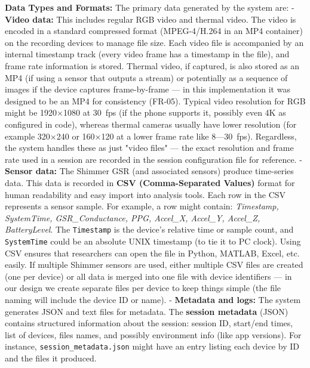 \textbf{Data Types and Formats:} The primary data generated by the system
are: - \textbf{Video data:} This includes regular RGB video and thermal
video. The video is encoded in a standard compressed format
(MPEG-4/H.264 in an MP4 container) on the recording devices to manage
file size. Each video file is accompanied by an internal timestamp track
(every video frame has a timestamp in the file), and frame rate
information is stored. Thermal video, if captured, is also stored as an
MP4 (if using a sensor that outputs a stream) or potentially as a
sequence of images if the device captures frame-by-frame --- in this
implementation it was designed to be an MP4 for consistency (FR-05).
Typical video resolution for RGB might be 1920×1080 at 30 fps (if the
phone supports it, possibly even 4K as configured in
code\cite{CameraRecorder}\cite{CameraRecorder}),
whereas thermal cameras usually have lower resolution (for example
320×240 or 160×120 at a lower frame rate like 8---30 fps). Regardless,
the system handles these as just "video files" --- the exact resolution
and frame rate used in a session are recorded in the session
configuration
file\cite{SessionManagerKt}\cite{DriverStressThermal2020}
for reference. - \textbf{Sensor data:} The Shimmer GSR (and associated
sensors) produce time-series data. This data is recorded in \textbf{CSV
(Comma-Separated Values)} format for human readability and easy import
into analysis tools. Each row in the CSV represents a sensor sample. For
example, a row might contain: \textit{Timestamp, SystemTime, GSR_Conductance,
PPG, Accel_X, Accel_Y, Accel_Z,
BatteryLevel}\cite{ShimmerRecorder}.
The \texttt{Timestamp} is the device's relative time or sample count, and
\texttt{SystemTime} could be an absolute UNIX timestamp (to tie it to PC
clock). Using CSV ensures that researchers can open the file in Python,
MATLAB, Excel, etc. easily. If multiple Shimmer sensors are used, either
multiple CSV files are created (one per device) or all data is merged
into one file with device identifiers --- in our design we create
separate files per device to keep things simple (the file naming will
include the device ID or name). - \textbf{Metadata and logs:} The system
generates JSON and text files for metadata. The \textbf{session metadata}
(JSON) contains structured information about the session: session ID,
start/end times, list of devices, files names, and possibly environment
info (like app versions). For instance, \texttt{session\_metadata.json} might
have an entry listing each device by ID and the files it
produced\cite{SessionManager}\cite{SessionManager}.
